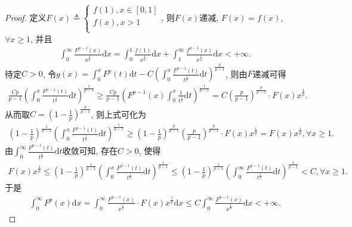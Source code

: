 \documentclass[../../main.tex]{subfiles}
\begin{document}
\begin{proof}
定义$F\left( x \right) \triangleq \begin{cases}
f\left( 1 \right) ,x\in \left[ 0,1 \right]\\
f\left( x \right) ,x>1\\
\end{cases}$, 则$F\left( x \right) $递减, $F\left( x \right) =f\left( x \right) $, $\forall x\geqslant 1$, 并且
\begin{align*}
\int_0^{\infty}{\frac{F^{p-1}\left( x \right)}{x^{\frac{1}{p}}}\mathrm{d}x}=\int_0^1{\frac{f\left( 1 \right)}{x^{\frac{1}{p}}}\mathrm{d}x}+\int_1^{\infty}{\frac{f^{p-1}\left( x \right)}{x^{\frac{1}{p}}}\mathrm{d}x}<+\infty .
\end{align*}
待定$C>0$, 令$g\left( x \right) =\int_0^x{F^p\left( t \right)}\mathrm{d}t-C\left( \int_0^x{\frac{F^{p-1}\left( t \right)}{t^{\frac{1}{p}}}\mathrm{d}t} \right) ^{\frac{p}{p-1}}$, 则由$F$递减可得
\begin{align*}
\frac{Cp}{p-1}\left( \int_0^x{\frac{F^{p-1}\left( t \right)}{t^{\frac{1}{p}}}\mathrm{d}t} \right) ^{\frac{1}{p-1}}\geqslant \frac{Cp}{p-1}\left( F^{p-1}\left( x \right) \int_0^x{\frac{1}{t^{\frac{1}{p}}}\mathrm{d}t} \right) ^{\frac{1}{p-1}}=C\left( \frac{p}{p-1} \right) ^{\frac{p}{p-1}}\cdot F\left( x \right) x^{\frac{1}{p}}.
\end{align*}
从而取$C=\left( 1-\frac{1}{p} \right) ^{\frac{p}{p-1}}$, 则上式可化为
\begin{align*}
\left( 1-\frac{1}{p} \right) ^{\frac{1}{p-1}}\left( \int_0^x{\frac{F^{p-1}\left( t \right)}{t^{\frac{1}{p}}}\mathrm{d}t} \right) ^{\frac{1}{p-1}}\geqslant \left( 1-\frac{1}{p} \right) ^{\frac{p}{p-1}}\left( \frac{p}{p-1} \right) ^{\frac{p}{p-1}}\cdot F\left( x \right) x^{\frac{1}{p}}=F\left( x \right) x^{\frac{1}{p}},\forall x\geqslant 1.
\end{align*}
由$\int_0^{\infty}{\frac{F^{p-1}\left( t \right)}{t^{\frac{1}{p}}}\mathrm{d}t}$收敛可知, 存在$C>0$, 使得
\begin{align*}
F\left( x \right) x^{\frac{1}{p}}\leqslant \left( 1-\frac{1}{p} \right) ^{\frac{1}{p-1}}\left( \int_0^x{\frac{F^{p-1}\left( t \right)}{t^{\frac{1}{p}}}\mathrm{d}t} \right) ^{\frac{1}{p-1}}\leqslant \left( 1-\frac{1}{p} \right) ^{\frac{1}{p-1}}\left( \int_0^{\infty}{\frac{F^{p-1}\left( t \right)}{t^{\frac{1}{p}}}\mathrm{d}t} \right) ^{\frac{1}{p-1}}<C,\forall x\geqslant 1.
\end{align*}
于是
\begin{align*}
\int_0^{\infty}{F^p\left( x \right)}\mathrm{d}x=\int_0^{\infty}{\frac{F^{p-1}\left( x \right)}{x^{\frac{1}{p}}}\cdot F\left( x \right) x^{\frac{1}{p}}\mathrm{d}x}\leqslant C\int_0^{\infty}{\frac{F^{p-1}\left( x \right)}{x^{\frac{1}{p}}}\mathrm{d}x}<+\infty .
\end{align*}
\end{proof}
\end{document}
